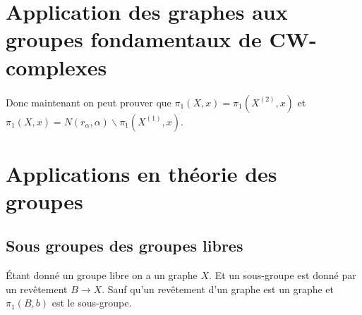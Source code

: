 \documentclass[a4paper,12pt]{book}
\theoremstyle{plain}
\theoremstyle{definition}
\theoremstyle{remark}
\begin{document}
\section{Application des graphes aux groupes fondamentaux de
CW-complexes}
Donc maintenant on peut prouver que $\pi_1(X,x)=\pi_1(X^{(2)},x)$
et $\pi_1(X,x)=N(r_\alpha,\alpha)\backslash\pi_1(X^{(1)},x)$.

\section{Applications en théorie des groupes}
\subsection{Sous groupes des groupes libres}
Étant donné un groupe libre on a un graphe $X$. Et un sous-groupe
est donné par un revêtement $B\to X$. Sauf qu'un revêtement d'un
graphe est un graphe et $\pi_1(B,b)$ est le sous-groupe.










\end{document}
